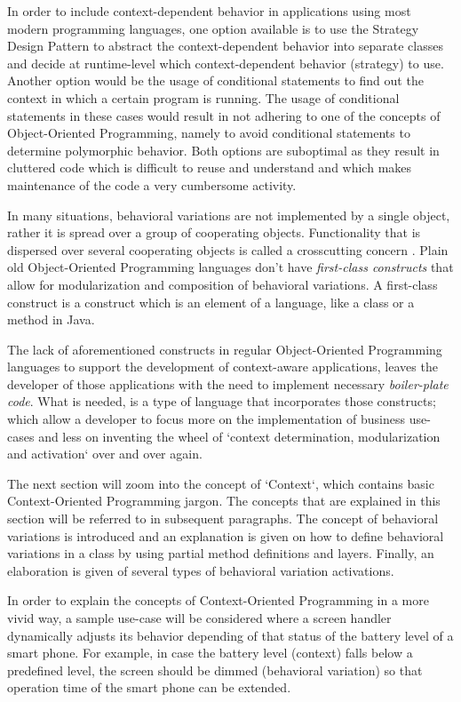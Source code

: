 \documentclass{acm_proc_article-sp}
\begin{document}
In order to include context-dependent behavior in applications using most modern programming languages, one option available is to use the Strategy Design Pattern to abstract the context-dependent behavior into separate classes and decide at runtime-level which context-dependent behavior (strategy) to use. Another option would be the usage of conditional statements to find out the context in which a certain program is running. The usage of conditional statements in these cases would result in not adhering to one of the concepts of Object-Oriented Programming, namely to avoid conditional statements to determine polymorphic behavior. Both options are suboptimal as they result in cluttered code which is difficult to reuse and understand and which makes maintenance of the code a very cumbersome activity.

In many situations, behavioral variations are not implemented by a single object, rather it is spread over a group of cooperating objects. Functionality that is dispersed over several cooperating objects is called a crosscutting concern \cite{kiczalesetallaop}. Plain old Object-Oriented Programming languages don't have \textit{first-class constructs} that allow for modularization and composition of behavioral variations. A first-class construct \cite{Keays:2003:CP:940923.940926} is a construct which is an element of a language, like a class or a method in Java. 

The lack of aforementioned constructs in regular Object-Oriented Programming languages to support the development of context-aware applications, leaves the developer of those applications with the need to implement necessary \textit{boiler-plate code}. What is needed, is a type of language that incorporates those constructs; which allow a developer to focus more on the implementation of business use-cases and less on inventing the wheel of `context determination, modularization and activation` over and over again. 

The next section will zoom into the concept of `Context`, which contains basic Context-Oriented Programming jargon. The concepts that are explained in this section will be referred to in subsequent paragraphs. The concept of behavioral variations is introduced and an explanation is given on how to define behavioral variations in a class by using partial method definitions and layers. Finally, an elaboration is given of several types of behavioral variation activations.

In order to explain the concepts of Context-Oriented Programming in a more vivid way, a sample use-case will be considered where a screen handler dynamically adjusts its behavior depending of that status of the battery level of a smart phone. For example, in case the battery level (context) falls below a predefined level, the screen should be dimmed (behavioral variation) so that operation time of the smart phone can be extended.
\end{document}
